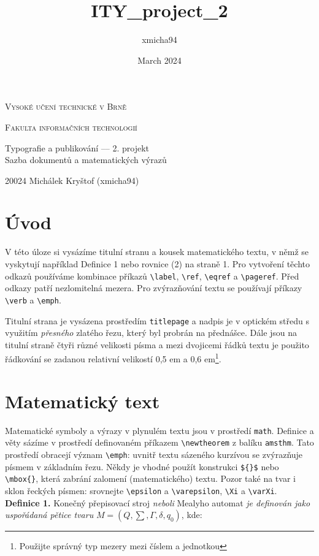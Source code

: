 \documentclass[a4paper, twocolumn, 11pt]{article}
\title{ITY_project_2}
\author{xmicha94}
\date{March 2024}
\begin{document}
\thispagestyle{empty}
\onecolumn
\begin{center}
\Huge 
\textsc{{\Huge Vysoké učení technické v Brně \\[0.5em]}}

\textsc{{\huge Fakulta informačních technologií}}
\vfill

{\LARGE Typografie a publikování –– 2. projekt \\[0.6em]
Sazba dokumentů a matematických výrazů}
\vfill
\end{center}

{\LARGE 20024 \hfill Michálek Kryštof (xmicha94)}

\newpage
\twocolumn
\section*{Úvod}
V této úloze si vysázíme titulní stranu a kousek matematického textu, v němž se vyskytují například Definice 1 nebo rovnice (2) na straně 1. Pro vytvoření těchto odkazů používáme kombinace příkazů \verb|\label|,
\verb|\ref|, \verb|\eqref| a \verb|\pageref|. Před odkazy patří nezlomitelná mezera. Pro zvýrazňování textu se používají
příkazy \verb|\verb| a \verb|\emph|.

Titulní strana je vysázena prostředím \texttt{titlepage}
a nadpis je v optickém středu s využitím \textit{přesného} zlatého řezu, který byl probrán na přednášce. Dále jsou
na titulní straně čtyři různé velikosti písma a mezi
dvojicemi řádků textu je použito řádkování se zadanou relativní velikostí 0,5 em a 0,6 em\footnote{Použijte správný typ mezery mezi číslem a jednotkou}.

\section{Matematický text}
Matematické symboly a výrazy v plynulém textu jsou
v prostředí \texttt{math}. Definice a věty sázíme v prostředí
definovaném příkazem \verb|\newtheorem| z balíku \texttt{amsthm}.
Tato prostředí obracejí význam \verb|\emph|: uvnitř textu
sázeného kurzívou se zvýrazňuje písmem v základním řezu. Někdy je vhodné použít konstrukci \verb|${}$|
nebo \verb|\mbox{}|, která zabrání zalomení (matematického) textu. Pozor také na tvar i sklon řeckých písmen:
srovnejte \verb|\epsilon| a \verb|\varepsilon|, \verb|\Xi| a \verb|\varXi|.
\textbf{Definice 1.} Konečný přepisovací stroj \textit{neboli} Mea\-ly\-ho automat \textit{je definován jako uspořádaná pětice
tvaru} $M = (Q, \sum, \Gamma, \delta, q_0)$, kde:
\end{document}

